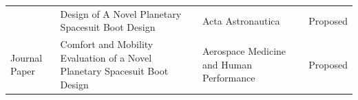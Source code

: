 \documentclass[defaultstyle,11pt]{comps}
\begin{document}
\begin{longtable}[]{@{}llll@{}}
\begin{minipage}[t]{0.22\columnwidth}
\end{minipage} & \begin{minipage}[t]{0.22\columnwidth}\raggedright
Design of A Novel Planetary Spacesuit Boot Design\strut
\end{minipage} & \begin{minipage}[t]{0.22\columnwidth}\raggedright
Acta Astronautica\strut
\end{minipage} & \begin{minipage}[t]{0.22\columnwidth}\raggedright
Proposed\strut
\end{minipage}\tabularnewline
\begin{minipage}[t]{0.22\columnwidth}\raggedright
Journal Paper\strut
\end{minipage} & \begin{minipage}[t]{0.22\columnwidth}\raggedright
Comfort and Mobility Evaluation of a Novel Planetary Spacesuit Boot Design\strut
\end{minipage} & \begin{minipage}[t]{0.22\columnwidth}\raggedright
Aerospace Medicine and Human Performance\strut
\end{minipage} & \begin{minipage}[t]{0.22\columnwidth}\raggedright
Proposed\strut
\end{minipage}\tabularnewline
\bottomrule
\end{longtable}
\end{document}
